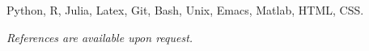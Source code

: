 \documentclass[
  date,
  number,
]{wgu-cv}
\begin{document}

Python,
R,
Julia,
Latex,
Git,
Bash,
Unix,
Emacs,
Matlab,
HTML,
CSS.




\emph{References are available upon request.}



\end{document}
